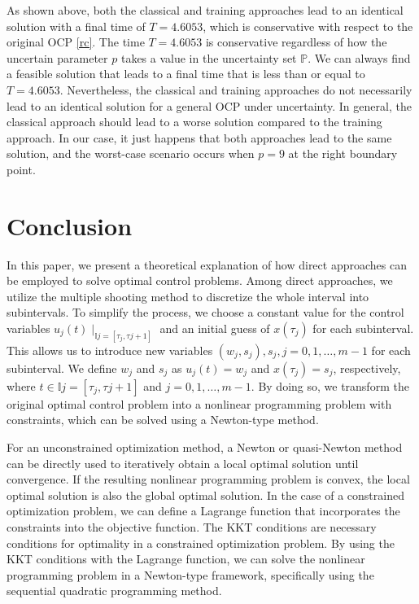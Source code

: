 \documentclass  [
  paper    = a4,
  BCOR     = 10mm,
  twoside,
  fontsize = 12pt,
  fleqn,
  toc      = bibnumbered,
  toc      = listofnumbered,
  numbers  = noendperiod,
  headings = normal,
  listof   = leveldown,
  version  = 3.03
]                                       {scrreprt}
\newcommand{\<}{\langle}
\renewcommand{\>}{\rangle}
\begin{document}
As shown above, both the classical and training approaches lead to an identical solution with a final time of $T=4.6053$, which is conservative with respect to the original OCP \ref{rc}. The time $T=4.6053$ is conservative regardless of how the uncertain parameter $p$ takes a value in the uncertainty set $\mathbb{P}$. We can always find a feasible solution that leads to a final time that is less than or equal to $T=4.6053$. Nevertheless, the classical and training approaches do not necessarily lead to an identical solution for a general OCP under uncertainty. In general, the classical approach should lead to a worse solution compared to the training approach. In our case, it just happens that both approaches lead to the same solution, and the worst-case scenario occurs when $p=9$ at the right boundary point.




\chapter{Conclusion}
\label{Chapter5}

In this paper, we present a theoretical explanation of how direct approaches can be employed to solve optimal control problems. Among direct approaches, we utilize the multiple shooting method to discretize the whole interval into subintervals. To simplify the process, we choose a constant value for the control variables $u_j(t)\mid_{\mathbb{I}j = [\tau_j,\tau{j+1}]}$ and an initial guess of $x(\tau_j)$ for each subinterval. This allows us to introduce new variables $(w_j, s_j), s_j, j=0,1,\dots,m-1$ for each subinterval. We define $w_j$ and $s_j$ as $u_j(t) = w_j$ and $x(\tau_j) = s_j$, respectively, where $t \in \mathbb{I}j = [\tau_j,\tau{j+1}]$ and $j=0,1,\dots,m-1$. By doing so, we transform the original optimal control problem into a nonlinear programming problem with constraints, which can be solved using a Newton-type method.

For an unconstrained optimization method, a Newton or quasi-Newton method can be directly used to iteratively obtain a local optimal solution until convergence. If the resulting nonlinear programming problem is convex, the local optimal solution is also the global optimal solution. In the case of a constrained optimization problem, we can define a Lagrange function that incorporates the constraints into the objective function. The KKT conditions are necessary conditions for optimality in a constrained optimization problem. By using the KKT conditions with the Lagrange function, we can solve the nonlinear programming problem in a Newton-type framework, specifically using the sequential quadratic programming method.
\end{document}
